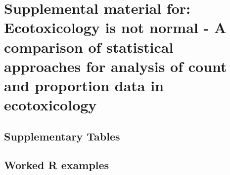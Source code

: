 \chapter[Supplemental material for: Ecotoxicology is not normal]{Supplemental material for: Ecotoxicology is not normal - A comparison of statistical approaches for analysis of count and proportion data in ecotoxicology}
\label{ap:usetheglm}  

\section{Supplementary Tables}
\label{ap:usetheglm:tables}  











\FloatBarrier

\section{Worked R examples}
\label{ap:usetheglm:examples}  

